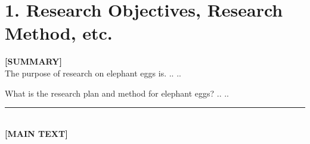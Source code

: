 \documentclass[10pt,a4j,dvipdfmx]{jarticle} 					%
\newcommand{\研究課題名}{象の卵}
\newcommand{\研究機関名}{逢坂大学}
\newcommand{\研究代表者氏名}{湯川秀樹}
\newcommand{\研究期間の最終元号年度}{7}  %
\begin{document}

\section{1. Research Objectives, Research Method, etc.}

\vspace*{-0.7cm}\noindent
\textbf{[SUMMARY]}\\
	The purpose of research on elephant eggs is. .. ..
	
	What is the research plan and method for elephant eggs? .. ..
	\vspace*{10zw}	%

\noindent
\rule{\linewidth}{1pt}\\
\noindent
\textbf{[MAIN TEXT]}
\JSPSInstructions	%

%
%
%




\end{document}
